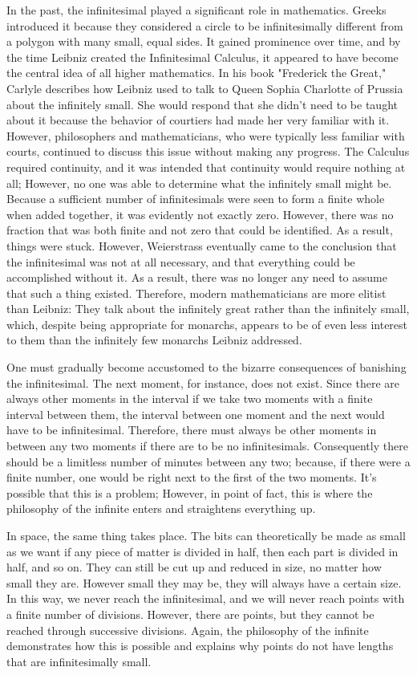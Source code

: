 \documentclass[a4paper,12pt]{book}[2004/02/16]
\theoremstyle{ilemma}
\theoremstyle{itheorem}
\theoremstyle{iother}
\theoremstyle{icorollary}
\theoremstyle{numcorollary}
\theoremstyle{idefinition}
\begin{document}
In the past, the infinitesimal played a significant role in mathematics. Greeks introduced it because they considered a circle to be infinitesimally different from a polygon with many small, equal sides. It gained prominence over time, and by the time Leibniz created the Infinitesimal Calculus, it appeared to have become the central idea of all higher mathematics. In his book "Frederick the Great," Carlyle describes how Leibniz used to talk to Queen Sophia Charlotte of Prussia about the infinitely small. She would respond that she didn't need to be taught about it because the behavior of courtiers had made her very familiar with it. However, philosophers and mathematicians, who were typically less familiar with courts, continued to discuss this issue without making any progress. The Calculus required continuity, and it was intended that continuity would require nothing at all; However, no one was able to determine what the infinitely small might be. Because a sufficient number of infinitesimals were seen to form a finite whole when added together, it was evidently not exactly zero. However, there was no fraction that was both finite and not zero that could be identified. As a result, things were stuck. However, Weierstrass eventually came to the conclusion that the infinitesimal was not at all necessary, and that everything could be accomplished without it. As a result, there was no longer any need to assume that such a thing existed. Therefore, modern mathematicians are more elitist than Leibniz: They talk about the infinitely great rather than the infinitely small, which, despite being appropriate for monarchs, appears to be of even less interest to them than the infinitely few monarchs Leibniz addressed.

One must gradually become accustomed to the bizarre consequences of banishing the infinitesimal. The next moment, for instance, does not exist. Since there are always other moments in the interval if we take two moments with a finite interval between them, the interval between one moment and the next would have to be infinitesimal. Therefore, there must always be other moments in between any two moments if there are to be no infinitesimals. Consequently there should be a limitless number of minutes
between any two; because, if there were a finite number, one would be right next to the first of the two moments. It's possible that this is a problem; However, in point of fact, this is where the philosophy of the infinite enters and straightens everything up.

In space, the same thing takes place. The bits can theoretically be made as small as we want if any piece of matter is divided in half, then each part is divided in half, and so on. They can still be cut up and reduced in size, no matter how small they are. However small they may be, they will always have a certain size. In this way, we never reach the infinitesimal, and we will never reach points with a finite number of divisions. However, there are points, but they cannot be reached through successive divisions. Again, the philosophy of the infinite demonstrates how this is possible and explains why points do not have lengths that are infinitesimally small.
\end{document}
